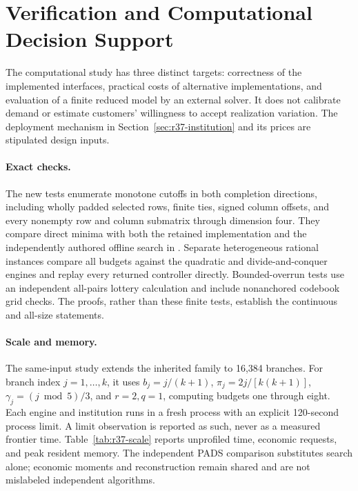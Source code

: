 \section{Verification and Computational Decision Support}\label{sec:r37-evidence}
The computational study has three distinct targets: correctness of the implemented interfaces, practical costs of alternative implementations, and evaluation of a finite reduced model by an external solver. It does not calibrate demand or estimate customers' willingness to accept realization variation. The deployment mechanism in Section~\ref{sec:r37-institution} and its prices are stipulated design inputs.

\paragraph{Exact checks.}
The new tests enumerate monotone cutoffs in both completion directions, including wholly padded selected rows, finite ties, signed column offsets, and every nonempty row and column submatrix through dimension four. They compare direct minima with both the retained implementation and the independently authored offline search in \citet{EppsteinPADS}. Separate heterogeneous rational instances compare all budgets against the quadratic and divide-and-conquer engines and replay every returned controller directly. Bounded-overrun tests use an independent all-pairs lottery calculation and include nonanchored codebook grid checks. The proofs, rather than these finite tests, establish the continuous and all-size statements.



\paragraph{Scale and memory.}
The same-input study extends the inherited family to 16,384 branches. For branch index $j=1,\ldots,k$, it uses $b_j=j/(k+1)$, $\pi_j=2j/[k(k+1)]$, $\gamma_j=(j\bmod5)/3$, and $r=2,q=1$, computing budgets one through eight. Each engine and institution runs in a fresh process with an explicit 120-second process limit. A limit observation is reported as such, never as a measured frontier time. Table~\ref{tab:r37-scale} reports unprofiled time, economic requests, and peak resident memory. The independent PADS comparison substitutes search alone; economic moments and reconstruction remain shared and are not mislabeled independent algorithms.

